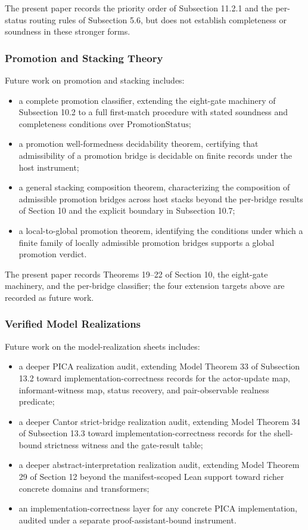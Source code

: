 \documentclass[11pt]{article}
\providecommand{\tightlist}{}
\theoremstyle{definition}
\begin{document}
The present paper records the priority order of Subsection 11.2.1 and the per-status routing rules of Subsection 5.6, but does not establish completeness or soundness in these stronger forms.

\subsubsection{Promotion and Stacking Theory}

Future work on promotion and stacking includes:

\begin{itemize}
\tightlist
\item
  a complete promotion classifier, extending the eight-gate machinery of Subsection 10.2 to a full first-match procedure with stated soundness and completeness conditions over \(\mathrm{PromotionStatus}\);
\item
  a promotion well-formedness decidability theorem, certifying that admissibility of a promotion bridge is decidable on finite records under the host instrument;
\item
  a general stacking composition theorem, characterizing the composition of admissible promotion bridges across host stacks beyond the per-bridge results of Section 10 and the explicit boundary in Subsection 10.7;
\item
  a local-to-global promotion theorem, identifying the conditions under which a finite family of locally admissible promotion bridges supports a global promotion verdict.
\end{itemize}

The present paper records Theorems 19--22 of Section 10, the eight-gate machinery, and the per-bridge classifier; the four extension targets above are recorded as future work.

\subsubsection{Verified Model Realizations}

Future work on the model-realization sheets includes:

\begin{itemize}
\tightlist
\item
  a deeper PICA realization audit, extending Model Theorem 33 of Subsection 13.2 toward implementation-correctness records for the actor-update map, informant-witness map, status recovery, and pair-observable realness predicate;
\item
  a deeper Cantor strict-bridge realization audit, extending Model Theorem 34 of Subsection 13.3 toward implementation-correctness records for the shell-bound strictness witness and the gate-result table;
\item
  a deeper abstract-interpretation realization audit, extending Model Theorem 29 of Section 12 beyond the manifest-scoped Lean support toward richer concrete domains and transformers;
\item
  an implementation-correctness layer for any concrete PICA implementation, audited under a separate proof-assistant-bound instrument.
\end{itemize}
\end{document}
